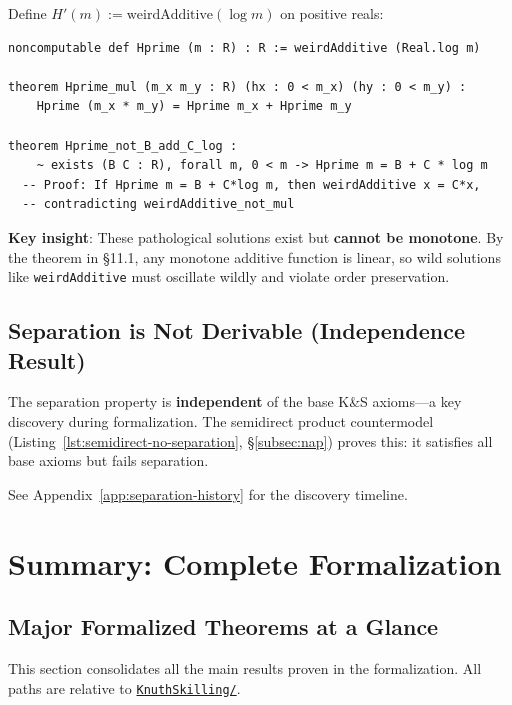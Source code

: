 \documentclass[11pt]{article}
\theoremstyle{definition}
\theoremstyle{remark}
\begin{document}
Define $H'(m) := \text{weirdAdditive}(\log m)$ on positive reals:

\begin{lstlisting}[caption={Multiplicative-additive pathology on positive reals}]
noncomputable def Hprime (m : R) : R := weirdAdditive (Real.log m)

theorem Hprime_mul (m_x m_y : R) (hx : 0 < m_x) (hy : 0 < m_y) :
    Hprime (m_x * m_y) = Hprime m_x + Hprime m_y

theorem Hprime_not_B_add_C_log :
    ~ exists (B C : R), forall m, 0 < m -> Hprime m = B + C * log m
  -- Proof: If Hprime m = B + C*log m, then weirdAdditive x = C*x,
  -- contradicting weirdAdditive_not_mul
\end{lstlisting}

\textbf{Key insight}: These pathological solutions exist but \textbf{cannot be monotone}.
By the theorem in \S11.1, any monotone additive function is linear, so wild solutions
like \texttt{weirdAdditive} must oscillate wildly and violate order preservation.

\subsection{Separation is Not Derivable (Independence Result)}
\label{subsec:separation-independence}

The separation property is \textbf{independent} of the base K\&S axioms---a key discovery during formalization. The semidirect product countermodel (Listing~\ref{lst:semidirect-no-separation}, \S\ref{subsec:nap}) proves this: it satisfies all base axioms but fails separation.

See Appendix~\ref{app:separation-history} for the discovery timeline.

\newpage
\section{Summary: Complete Formalization}

\subsection{Major Formalized Theorems at a Glance}

This section consolidates all the main results proven in the formalization.
All paths are relative to \href{https://github.com/zariuq/ks-foundations-of-inference/tree/main/KnuthSkilling/}{\texttt{KnuthSkilling/}}.
\end{document}
